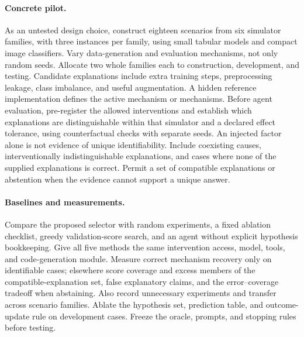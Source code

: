 \paragraph{Concrete pilot.}
As an untested design choice, construct eighteen scenarios from six simulator families, with three instances per family, using small tabular models and compact image classifiers. Vary data-generation and evaluation mechanisms, not only random seeds. Allocate two whole families each to construction, development, and testing. Candidate explanations include extra training steps, preprocessing leakage, class imbalance, and useful augmentation. A hidden reference implementation defines the active mechanism or mechanisms. Before agent evaluation, pre-register the allowed interventions and establish which explanations are distinguishable within that simulator and a declared effect tolerance, using counterfactual checks with separate seeds. An injected factor alone is not evidence of unique identifiability. Include coexisting causes, interventionally indistinguishable explanations, and cases where none of the supplied explanations is correct. Permit a set of compatible explanations or abstention when the evidence cannot support a unique answer.

\paragraph{Baselines and measurements.}
Compare the proposed selector with random experiments, a fixed ablation checklist, greedy validation-score search, and an agent without explicit hypothesis bookkeeping. Give all five methods the same intervention access, model, tools, and code-generation module. Measure correct mechanism recovery only on identifiable cases; elsewhere score coverage and excess members of the compatible-explanation set, false explanatory claims, and the error--coverage tradeoff when abstaining. Also record unnecessary experiments and transfer across scenario families. Ablate the hypothesis set, prediction table, and outcome-update rule on development cases. Freeze the oracle, prompts, and stopping rules before testing.


